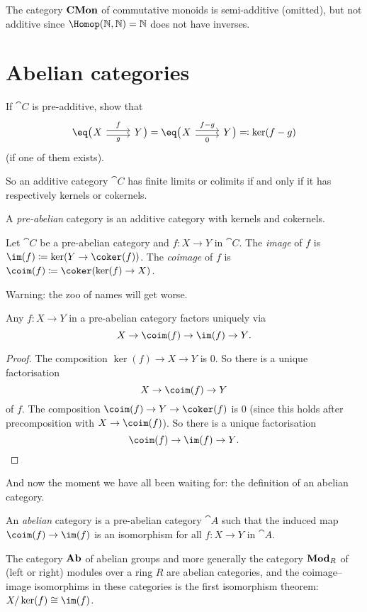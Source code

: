 \documentclass[../main.tex]{subfiles}
\begin{document}
\begin{exmp}
The category $\mathbf{CMon}$ of commutative monoids is semi-additive (omitted), but not additive since $\Hom(\bb N, \bb N) = \bb N$ does not have inverses.
\end{exmp}

\section{Abelian categories}
\begin{exc}
  If $\cat C$ is pre-additive, show that \[
      \eq\bigl(\!\!\begin{tikzcd} X \ar[r, shift left, "f"] \ar[r, shift right, "g"'] & Y \end{tikzcd}\!\!\bigr) = \eq\bigl(\!\!\begin{tikzcd} X \ar[r, shift left, "f-g"] \ar[r, shift right, "0"'] & Y \end{tikzcd}\!\!\bigr) \eqcolon \ker(f-g)
    \] (if one of them exists).
\end{exc}
So an additive category $\cat C$ has finite limits or colimits if and only if it has respectively kernels or cokernels.
\begin{defn}
  A \emph{pre-abelian} category is an additive category with kernels and cokernels.
\end{defn}
\begin{defn}
  Let $\cat C$ be a pre-abelian category and $f\colon X \to Y$ in $\cat C$. The \emph{image} of $f$ is $\im(f) \coloneq \ker(Y \to \coker(f))$. The \emph{coimage} of $f$ is $\coim(f) \coloneq \coker(\ker(f) \to X)$.
\end{defn}
Warning: the zoo of names will get worse.
\begin{lem}
  Any $f\colon X \to Y$ in a pre-abelian category factors uniquely via \[
      X \to \coim(f) \to \im(f) \to Y\text{.}
    \]
\end{lem}
\begin{proof}
  The composition $\ker(f) \to X \to Y$ is $0$. So there is a unique factorisation \[
      X \to \coim(f) \to Y
    \] of $f$. The composition $\coim(f) \to Y \to \coker(f)$ is $0$ (since this holds after precomposition with $X \to \coim(f)$). So there is a unique factorisation \[
      \coim(f) \to \im(f) \to Y\text{.} \qedhere
    \]
\end{proof}
And now the moment we have all been waiting for: the definition of an abelian category.

\begin{defn}\label{defn:abelian-category}
  An \emph{abelian} category is a pre-abelian category $\cat A$ such that the induced map $\coim(f) \to \im(f)$ is an isomorphism for all $f\colon X \to Y$ in $\cat A$.
\end{defn}
\begin{exmp}
The category $\mathbf{Ab}$ of abelian groups and more generally the category $\catModule_R$ of (left or right) modules over a ring \(R\) are abelian categories, and the coimage--image isomorphims in these categories is the first isomorphism theorem: $X/\ker(f) \cong \im(f)$.
\end{exmp}
\end{document}
